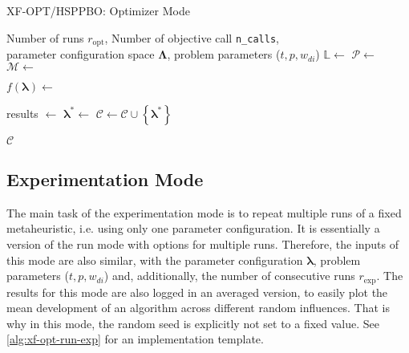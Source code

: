 \begin{algorithm}
	\caption{XF-OPT/HSPPBO: Optimizer Mode}
	\label{alg:xf-opt}
	\begin{algorithmic}
		\Require Number of runs $r_{\text{opt}}$, Number of objective call \texttt{n\_calls},\\ \quad parameter configuration space $\mathbf{\Lambda}$, problem parameters ($t, p, w_{di}$)
		\State $\mathbb{L}  \gets $  
		\State $\mathcal{P}  \gets $ 
		\State $\mathcal{M}  \gets $ 
		
		\State {}
		
		\State $f(\mathbf{\lambda}) \gets  $ 
		
		\State {}
		\State results $\gets $ 
		\State {}
		\State $\mathbf{\lambda}^* \gets$ 
		\State $\mathcal{C} \gets \mathcal{C} \cup \left\lbrace \mathbf{\lambda}^* \right\rbrace$
		
		\EndFor
		\State \Return $\mathcal{C}$
	\end{algorithmic}
\end{algorithm}

\subsection{Experimentation Mode}
\label{chap:exp-mode}

The main task of the experimentation mode is to repeat multiple runs of a fixed metaheuristic, i.e. using only one parameter configuration. It is essentially a version of the run mode with options for multiple runs. Therefore, the inputs of this mode are also similar, with the parameter configuration $\mathbf{\lambda}$, problem parameters ($t, p, w_{di}$) and, additionally, the number of consecutive runs $r_\text{exp}$. The results for this mode are also logged in an averaged version, to easily plot the mean development of an algorithm across different random influences. That is why in this mode, the random seed is explicitly not set to a fixed value. See \cref{alg:xf-opt-run-exp} for an implementation template.


